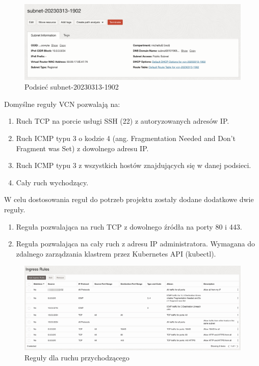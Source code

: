 \begin{figure}[H]
    \centering
    \includegraphics[width=\textwidth]{img/oci-subnet}
    \caption{Podsieć subnet-20230313-1902}
    \label{fig:oci-subnet}
\end{figure}

Domyślne reguły VCN\cite{oci-security-lists} pozwalają na:
\begin{enumerate}
    \item Ruch TCP na porcie usługi SSH (22) z autoryzowanych adresów IP.
    \item Ruch ICMP typu 3 o kodzie 4 (ang. Fragmentation Needed and Don't Fragment was Set) z dowolnego adresu IP.
    \item Ruch ICMP typu 3 z wszystkich hostów znajdujących się w danej podsieci.
    \item Cały ruch wychodzący.
\end{enumerate}

W celu dostosowania reguł do potrzeb projektu zostały dodane dodatkowe dwie reguły.
\begin{enumerate}
    \item Reguła pozwalająca na ruch TCP z dowolnego źródła na porty 80 i 443.
    \item Reguła pozwalająca na cały ruch z adresu IP administratora. Wymagana do zdalnego zarządzania klastrem przez Kubernetes API (kubectl).
\end{enumerate}

\begin{figure}[H]
    \centering
    \includegraphics[width=\textwidth]{img/oci-subnet-ingress-rules}
    \caption{Reguły dla ruchu przychodzącego}
    \label{fig:oci-subnet-ingress-rules}
\end{figure}

